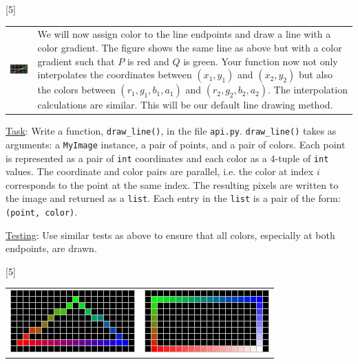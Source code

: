 \documentclass[addpoints]{exam}
\begin{document}
\begin{questions}
  [5]

  \noindent\begin{tabularx}{\linewidth}{lX}
    \includegraphics[align=t]{dda-color} &
    We will now assign color to the line endpoints and draw a line with a color gradient. The figure shows the same line as above but with a color gradient such that $P$ is red and $Q$ is green. Your function now not only interpolates the coordinates between $(x_1,y_1)$ and  $(x_2,y_2)$ but also the colors between $(r_1, g_1, b_1, a_1)$ and  $(r_2, g_2, b_2, a_2)$. The interpolation calculations are similar. This will be our default line drawing method.
  \end{tabularx}
  \underline{Task}: Write a function, \texttt{draw\_line()}, in the file \texttt{api.py}. \texttt{draw\_line()} takes as arguments: a \texttt{MyImage} instance, a pair of points, and a pair of colors. Each point is represented as a pair of \texttt{int} coordinates and each color as a 4-tuple of \texttt{int} values. The coordinate and color pairs are parallel, i.e. the color at index $i$ corresponds to the point at the same index. The resulting pixels are written to the image and returned as a \texttt{list}. Each entry in the \texttt{list} is a pair of the form: \texttt{(point, color)}.

  \underline{Testing}: Use similar tests as above to ensure that all colors, especially at both endpoints, are drawn.

  [5]

  \begin{center}
    \begin{tabular}{cc}
      \includegraphics[align=t]{tri} & \includegraphics[align=t]{quad}
    \end{tabular}
  \end{center}
  

\end{questions}
\end{document}
